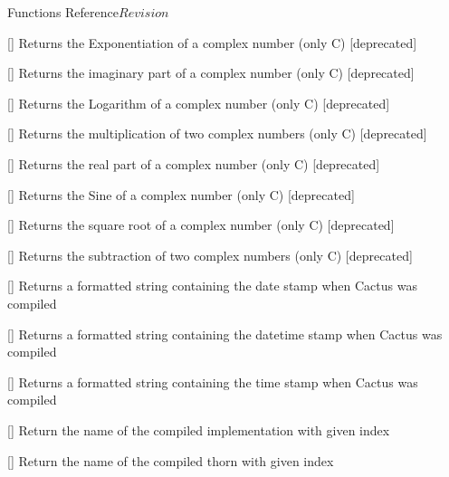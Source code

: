 \begin{cactuspart}{ Functions Reference}{}{$Revision$}
\begin{Lentry}
\item[\code{CCTK\_CmplxExp}] [\pageref{CCTK-CmplxExp}]
  Returns the Exponentiation of a complex number (only C) [deprecated]

\item[\code{CCTK\_CmplxImag}] [\pageref{CCTK-CmplxImag}]
  Returns the imaginary part of a complex number (only C) [deprecated]

\item[\code{CCTK\_CmplxLog}] [\pageref{CCTK-CmplxLog}]
  Returns the Logarithm of a complex number (only C) [deprecated]

\item[\code{CCTK\_CmplxMul}] [\pageref{CCTK-CmplxMul}]
  Returns the multiplication of two complex numbers (only C) [deprecated]

\item[\code{CCTK\_CmplxReal}] [\pageref{CCTK-CmplxReal}]
  Returns the real part of a complex number (only C) [deprecated]

\item[\code{CCTK\_CmplxSin}] [\pageref{CCTK-CmplxSin}]
  Returns the Sine of a complex number (only C) [deprecated]

\item[\code{CCTK\_CmplxSqrt}] [\pageref{CCTK-CmplxSqrt}]
  Returns the square root of a complex number (only C) [deprecated]

\item[\code{CCTK\_CmplxSub}] [\pageref{CCTK-CmplxSub}]
  Returns the subtraction of two complex numbers (only C) [deprecated]

\item[\code{CCTK\_CompileDate}] [\pageref{CCTK-CompileDate}]
  Returns a formatted string containing the date stamp when Cactus was compiled

\item[\code{CCTK\_CompileDateTime}] [\pageref{CCTK-CompileDateTime}]
  Returns a formatted string containing the datetime stamp when Cactus was compiled

\item[\code{CCTK\_CompileTime}] [\pageref{CCTK-CompileTime}]
  Returns a formatted string containing the time stamp when Cactus was compiled

\item[\code{CCTK\_CompiledImplementation}]
  [\pageref{CCTK-CompiledImplementation}]
  Return the name of the compiled implementation with given index

\item[\code{CCTK\_CompiledThorn}] [\pageref{CCTK-CompiledThorn}]
  Return the name of the compiled thorn with given index


\end{Lentry}
\end{cactuspart}
